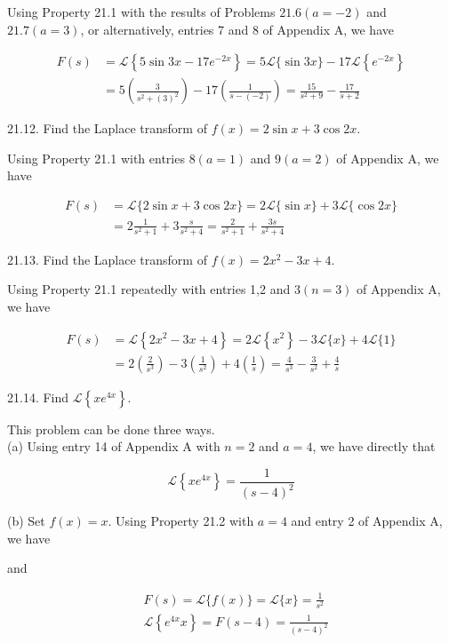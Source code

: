 \documentclass[10pt]{article}
\begin{document}
Using Property 21.1 with the results of Problems $21.6(a=-2)$ and $21.7(a=3)$, or alternatively, entries 7 and 8 of Appendix A, we have

$$
\begin{aligned}
F(s) & =\mathscr{L}\left\{5 \sin 3 x-17 e^{-2 x}\right\}=5 \mathscr{L}\{\sin 3 x\}-17 \mathscr{L}\left\{e^{-2 x}\right\} \\
& =5\left(\frac{3}{s^{2}+(3)^{2}}\right)-17\left(\frac{1}{s-(-2)}\right)=\frac{15}{s^{2}+9}-\frac{17}{s+2}
\end{aligned}
$$

21.12. Find the Laplace transform of $f(x)=2 \sin x+3 \cos 2 x$.

Using Property 21.1 with entries $8(a=1)$ and $9(a=2)$ of Appendix A, we have

$$
\begin{aligned}
F(s) & =\mathscr{L}\{2 \sin x+3 \cos 2 x\}=2 \mathscr{L}\{\sin x\}+3 \mathscr{L}\{\cos 2 x\} \\
& =2 \frac{1}{s^{2}+1}+3 \frac{s}{s^{2}+4}=\frac{2}{s^{2}+1}+\frac{3 s}{s^{2}+4}
\end{aligned}
$$

21.13. Find the Laplace transform of $f(x)=2 x^{2}-3 x+4$.

Using Property 21.1 repeatedly with entries 1,2 and $3(n=3)$ of Appendix A, we have

$$
\begin{aligned}
F(s) & =\mathscr{L}\left\{2 x^{2}-3 x+4\right\}=2 \mathscr{L}\left\{x^{2}\right\}-3 \mathscr{L}\{x\}+4 \mathscr{L}\{1\} \\
& =2\left(\frac{2}{s^{3}}\right)-3\left(\frac{1}{s^{2}}\right)+4\left(\frac{1}{s}\right)=\frac{4}{s^{3}}-\frac{3}{s^{2}}+\frac{4}{s}
\end{aligned}
$$

21.14. Find $\mathscr{L}\left\{x e^{4 x}\right\}$.

This problem can be done three ways.\\
(a) Using entry 14 of Appendix A with $n=2$ and $a=4$, we have directly that

$$
\mathscr{L}\left\{x e^{4 x}\right\}=\frac{1}{(s-4)^{2}}
$$

(b) Set $f(x)=x$. Using Property 21.2 with $a=4$ and entry 2 of Appendix A, we have

and

$$
\begin{aligned}
& F(s)=\mathscr{L}\{f(x)\}=\mathscr{L}\{x\}=\frac{1}{s^{2}} \\
& \mathscr{L}\left\{e^{4 x} x\right\}=F(s-4)=\frac{1}{(s-4)^{2}}
\end{aligned}
$$
\end{document}
